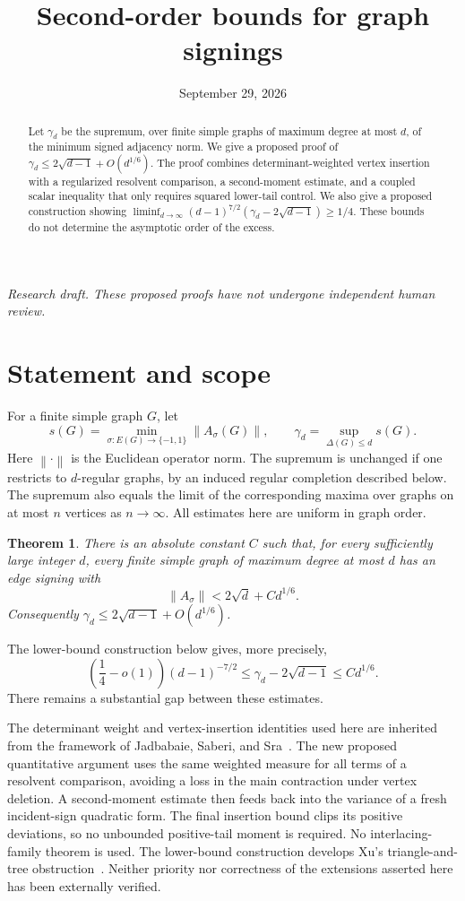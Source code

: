 \documentclass[11pt]{article}
\title{Second-order bounds for graph signings}
\author{}
\date{September 29, 2026}
\numberwithin{equation}{section}
\newtheorem{theorem}{Theorem}[section]
\newcommand{\norm}[1]{\left\lVert#1\right\rVert}
\begin{document}
\maketitle
\begin{abstract}
Let $\gamma_d$ be the supremum, over finite simple graphs of maximum
degree at most $d$, of the minimum signed adjacency norm. We give a
proposed proof of $\gamma_d\le 2\sqrt{d-1}+O(d^{1/6})$.
The proof combines determinant-weighted vertex insertion with a
regularized resolvent comparison, a second-moment estimate, and a
coupled scalar inequality that only requires squared lower-tail
control. We also give a proposed construction showing
$\liminf_{d\to\infty}(d-1)^{7/2}(\gamma_d-2\sqrt{d-1})\ge1/4$.
These bounds do not determine the asymptotic order of the excess.
\end{abstract}
\begin{center}\small\textit{Research draft. These proposed proofs have not
undergone independent human review.}\end{center}

\section{Statement and scope}
For a finite simple graph $G$, let
\[
 s(G)=\min_{\sigma:E(G)\to\{-1,1\}}\norm{A_\sigma(G)},
 \qquad \gamma_d=\sup_{\Delta(G)\le d}s(G).
\]
Here $\norm{\cdot}$ is the Euclidean operator norm. The supremum is
unchanged if one restricts to $d$-regular graphs, by an induced
regular completion described below. The supremum also equals the
limit of the corresponding maxima over graphs on at most $n$
vertices as $n\to\infty$. All estimates here are uniform in graph order.

\begin{theorem}\label{thm:upper}
There is an absolute constant $C$ such that, for every sufficiently
large integer $d$, every finite simple graph of maximum degree at
most $d$ has an edge signing with
\[
 \norm{A_\sigma}<2\sqrt d+C d^{1/6}.
\]
Consequently $\gamma_d\le2\sqrt{d-1}+O(d^{1/6})$.
\end{theorem}

The lower-bound construction below gives, more precisely,
\[
 \left(\frac14-o(1)\right)(d-1)^{-7/2}
 \le\gamma_d-2\sqrt{d-1}\le C d^{1/6}.
\]
There remains a substantial gap between these estimates.

The determinant weight and vertex-insertion identities used here
are inherited from the framework of Jadbabaie, Saberi, and
Sra~\cite[Section~6]{JSS}. The new proposed quantitative argument
uses the same weighted measure for all terms of a resolvent
comparison, avoiding a loss in the main contraction under vertex
deletion. A second-moment estimate then feeds back into the variance
of a fresh incident-sign quadratic form. The final insertion bound
clips its positive deviations, so no unbounded positive-tail moment
is required. No interlacing-family theorem is used.
The lower-bound construction develops Xu's triangle-and-tree
obstruction~\cite{Xu}. Neither priority nor correctness of the
extensions asserted here has been externally verified.
\end{document}
